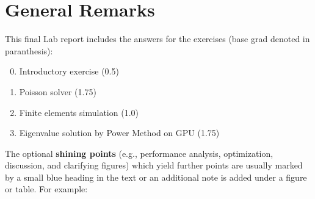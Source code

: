 \section*{General Remarks}
This final Lab report includes the answers for the exercises (base grad denoted in paranthesis):
\begin{enumerate}
    \setcounter{enumi}{-1}
    \item Introductory exercise (0.5)
    \item Poisson solver (1.75)
    \item Finite elements simulation (1.0)
    \item Eigenvalue solution by Power Method on GPU (1.75)
\end{enumerate}
The optional \textbf{shining points} (e.g., performance analysis, optimization, discussion, and
clarifying figures) which yield further points are usually marked by a small blue heading in the text or an additional note is added under a figure or table. For example:\\ 
